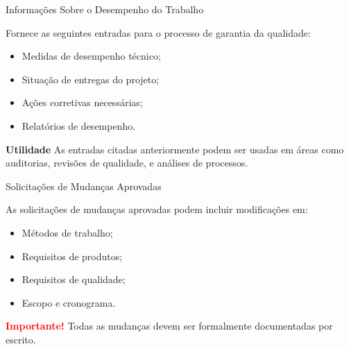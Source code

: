 \documentclass[xcolor=x11names,compress]{beamer}
\begin{document}
\begin{frame}{Informações Sobre o Desempenho do Trabalho}

Fornece as seguintes entradas para o processo de garantia da qualidade:

\begin{itemize}
\itemsep 5mm

\item Medidas de desempenho técnico;

\item Situação de entregas do projeto;

\item Ações corretivas necessárias;

\item Relatórios de desempenho.

\end{itemize}

\pause

\begin{alertblock}{\centering \textbf{Utilidade}}
As entradas citadas anteriormente podem ser usadas em áreas como auditorias, revisões de qualidade, e análises de processos.
\end{alertblock}

\end{frame}

\begin{frame}{Solicitações de Mudanças Aprovadas}

As solicitações de mudanças aprovadas podem incluir modificações em:

\begin{itemize}
\itemsep 5mm

\item Métodos de trabalho;

\item Requisitos de produtos;

\item Requisitos de qualidade;

\item Escopo e cronograma.

\end{itemize}

\pause

\begin{alertblock}{\centering \textbf{\textcolor{red}{Importante!}}}
Todas as mudanças devem ser formalmente documentadas por escrito.
\end{alertblock}

\end{frame}
\end{document}
